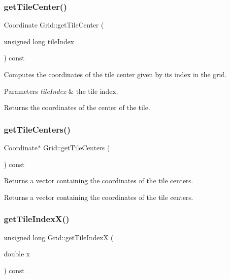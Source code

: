 \subsubsection{\texorpdfstring{get\+Tile\+Center()}{getTileCenter()}}
{\footnotesize\ttfamily Coordinate Grid\+::get\+Tile\+Center (\begin{DoxyParamCaption}\item[{unsigned long}]{tile\+Index }\end{DoxyParamCaption}) const}

Computes the coordinates of the tile center given by its index in the grid. 
\begin{DoxyParams}{Parameters}
{\em tile\+Index} & the tile index. \\
\hline
\end{DoxyParams}
\begin{DoxyReturn}{Returns}
the coordinates of the center of the tile. 
\end{DoxyReturn}
\mbox{\label{class_grid_aa1b1f4c938207b16694a27cb9beb66eb}} 
\subsubsection{\texorpdfstring{get\+Tile\+Centers()}{getTileCenters()}}
{\footnotesize\ttfamily Coordinate$\ast$ Grid\+::get\+Tile\+Centers (\begin{DoxyParamCaption}{ }\end{DoxyParamCaption}) const}

Returns a vector containing the coordinates of the tile centers. \begin{DoxyReturn}{Returns}
a vector containing the coordinates of the tile centers. 
\end{DoxyReturn}
\mbox{\label{class_grid_a5ab67c336ac08c690a0e8b03c12f02e5}} 
\subsubsection{\texorpdfstring{get\+Tile\+Index\+X()}{getTileIndexX()}\hspace{0.1cm}{\footnotesize\ttfamily [1/2]}}
{\footnotesize\ttfamily unsigned long Grid\+::get\+Tile\+IndexX (\begin{DoxyParamCaption}\item[{double}]{x }\end{DoxyParamCaption}) const\hspace{0.3cm}{\ttfamily [private]}}

